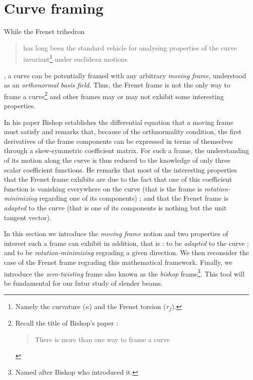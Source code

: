 
\section{Curve framing}


While the Frenet trihedron \blockcquote[p.1]{Bishop1975}{has long been the standard vehicle for analysing properties of the curve invariant\footnote{Namely the curvature ($\kappa$) and the Frenet torsion ($\tau_f$).} under euclidean motions}, a curve can be potentially framed with any arbitrary \emph{moving frame}, understood as an \emph{orthonormal basis field}. Thus, the Frenet frame is not the only way to frame a curve\footnote{Recall the title of Bishop's paper : \blockcquote[]{Bishop1975}{There is more than one way to frame a curve}.} and other frames may or may not exhibit some interesting properties.

In his paper \cite{Bishop1975} Bishop establishes the differential equation that a moving frame must satisfy and remarks that, because of the orthnormality condition, the first derivatives of the frame components can be expressed in terms of themselves through a skew-symmetric coefficient matrix. For such a frame, the understanding of its motion along the curve is thus reduced to the knowledge of only three scalar coefficient functions. He remarks that most of the interesting properties that the Frenet frame exhibits are due to the fact that one of this coefficient function is vanishing everywhere on the curve (that is the frame is \emph{rotation-minimizing} regarding one of its components) ; and that the Frenet frame is \emph{adapted} to the curve (that is one of its components is nothing but the unit tangent vector).

In this section we introduce the \emph{moving frame} notion and two properties of interest such a frame can exhibit in addition, that is : to be \emph{adapted} to the curve ; and to be \emph{rotation-minimizing} regrading a given direction. We then reconsider the case of the Frenet frame regrading this mathematical framework. Finally, we introduce the \emph{zero-twisting} frame also known as the \emph{bishop} frame\footnote{Named after Bishop who introduced it.}. This tool will be fundamental for our futur study of slender beams.

